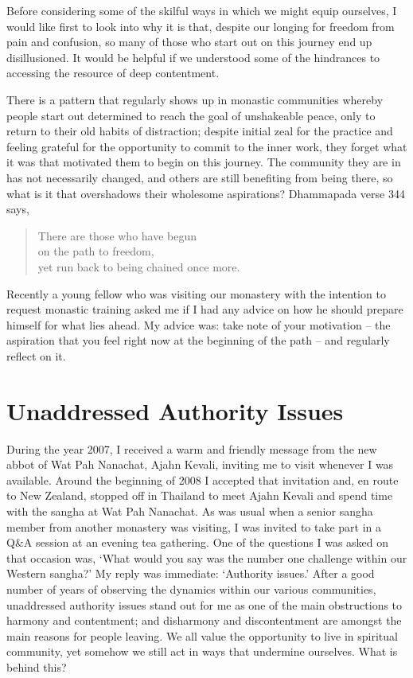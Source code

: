 Before considering some of the skilful ways in which we might equip
ourselves, I would like first to look into why it is that, despite our
longing for freedom from pain and confusion, so many of those who start
out on this journey end up disillusioned. It would be helpful if we
understood some of the hindrances to accessing the resource of deep
contentment.

There is a pattern that regularly shows up in monastic communities
whereby people start out determined to reach the goal of unshakeable
peace, only to return to their old habits of distraction; despite
initial zeal for the practice and feeling grateful for the opportunity to
commit to the inner work, they forget what it was that motivated them to
begin on this journey. The community they are in has not necessarily
changed, and others are still benefiting from being there, so what is it
that overshadows their wholesome aspirations? Dhammapada verse 344 says,

\begin{quote}
  There are those who have begun\\
  on the path to freedom,\\
  yet run back to being chained once more.
\end{quote}

Recently a young fellow who was visiting our monastery with the
intention to request monastic training asked me if I had any advice on
how he should prepare himself for what lies ahead. My advice was: take
note of your motivation -- the aspiration that you feel right now at the
beginning of the path -- and regularly reflect on it.

\section{Unaddressed Authority Issues}

During the year 2007, I received a warm and friendly message from the
new abbot of Wat Pah Nanachat, Ajahn Kevali, inviting me to visit
whenever I was available. Around the beginning of 2008 I accepted that
invitation and, en route to New Zealand, stopped off in Thailand to meet
Ajahn Kevali and spend time with the sangha at Wat Pah Nanachat. As was
usual when a senior sangha member from another monastery was visiting, I
was invited to take part in a Q\&A session at an evening tea gathering.
One of the questions I was asked on that occasion was, `What would you
say was the number one challenge within our Western sangha?' My reply
was immediate: `Authority issues.' After a good \mbox{number} of years of
observing the dynamics within our various communities, unaddressed
authority issues stand out for me as one of the main obstructions to
harmony and contentment; and disharmony and discontentment are amongst
the main reasons for people leaving. We all value the opportunity to
live in spiritual community, yet somehow we still act in ways that
undermine ourselves. What is behind this?

